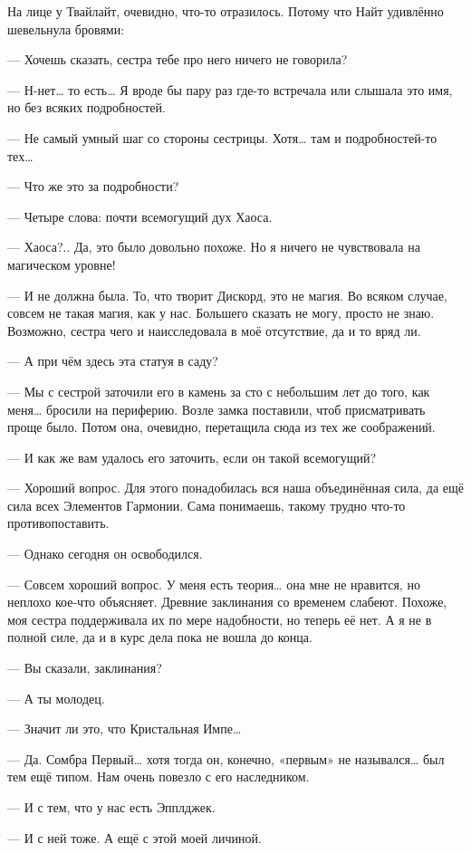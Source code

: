 \documentclass[twoside,a5paper,12pt]{extbook}
\begin{document}
На лице у Твайлайт, очевидно, что-то отразилось. Потому что Найт удивлённо шевельнула бровями:

— Хочешь сказать, сестра тебе про него ничего не говорила?

— Н-нет… то есть… Я вроде бы пару раз где-то встречала или слышала это имя, но без всяких подробностей.

— Не самый умный шаг со стороны сестрицы. Хотя… там и подробностей-то тех…

— Что же это за подробности?

— Четыре слова: почти всемогущий дух Хаоса.

— Хаоса?.. Да, это было довольно похоже. Но я ничего не чувствовала на магическом уровне!

— И не должна была. То, что творит Дискорд, это не магия. Во всяком случае, совсем не такая магия, как у нас. Большего сказать не могу, просто не знаю. Возможно, сестра чего и наисследовала в моё отсутствие, да и то вряд ли.

— А при чём здесь эта статуя в саду?

— Мы с сестрой заточили его в камень за сто с небольшим лет до того, как меня… бросили на периферию. Возле замка поставили, чтоб присматривать проще было. Потом она, очевидно, перетащила сюда из тех же соображений.

— И как же вам удалось его заточить, если он такой всемогущий?

— Хороший вопрос. Для этого понадобилась вся наша объединённая сила, да ещё сила всех Элементов Гармонии. Сама понимаешь, такому трудно что-то противопоставить.

— Однако сегодня он освободился.

— Совсем хороший вопрос. У меня есть теория… она мне не нравится, но неплохо кое-что объясняет. Древние заклинания со временем слабеют. Похоже, моя сестра поддерживала их по мере надобности, но теперь её нет. А я не в полной силе, да и в курс дела пока не вошла до конца.

— Вы сказали, заклинания?

— А ты молодец.

— Значит ли это, что Кристальная Импе…

— Да. Сомбра Первый… хотя тогда он, конечно, «первым» не назывался… был тем ещё типом. Нам очень повезло с его наследником.

— И с тем, что у нас есть Эпплджек.

— И с ней тоже. А ещё с этой моей личиной.
\end{document}
